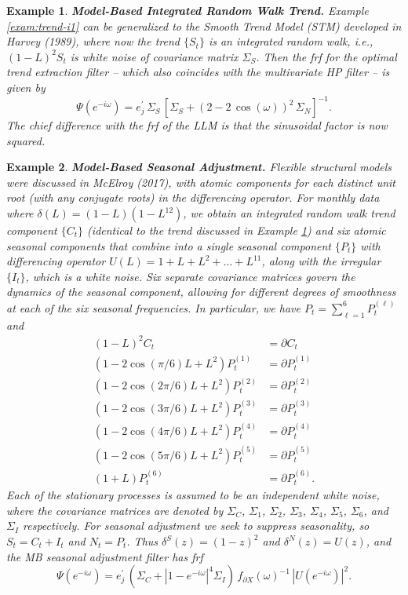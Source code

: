 \documentclass[a4paper]{book}
\newtheorem{Example}{Example}
\begin{document}
\begin{Example} {\bf Model-Based Integrated Random Walk Trend.} \rm
\label{exam:trend-i2}
  Example \ref{exam:trend-i1} can be generalized to the Smooth 
  Trend Model (STM) developed in Harvey (1989),
 where now the trend $\{ S_t \}$ is an integrated random walk, 
 i.e., ${(1-L)}^2 S_t$ is white noise of
 covariance matrix $\Sigma_{S}$.   Then the frf for the optimal 
 trend extraction filter -- which also coincides
 with the multivariate HP filter  -- is given by
\[ 
 \Psi (e^{-i \omega}) = e_j^{\prime} \, \Sigma_{S} \, 
 { \left[ \Sigma_{S} + {(2 - 2 \, \cos (\omega))}^2 \, \Sigma_{N} \right] }^{-1}.
\]
 The chief difference with the frf of the LLM is that the sinusoidal factor is now squared.  
\end{Example}




\begin{Example} {\bf Model-Based Seasonal Adjustment.} \rm
\label{exam:sa}
  Flexible structural models were discussed in McElroy (2017), 
  with atomic components for each distinct unit root
 (with any conjugate roots) in the differencing operator.  
 For monthly data  where $\delta (L) = (1-L)(1-L^{12})$,
 we obtain an integrated random walk trend component $\{ C_t \}$ 
 (identical to the trend discussed in Example \ref{exam:trend-i2})
 and six atomic seasonal components that combine into a single 
 seasonal component $\{ P_t \}$ with differencing
 operator $U(L) = 1 + L + L^2 + \ldots + L^{11}$, along with the
 irregular $\{ I_t \}$, which is a white noise. 
  Six separate covariance matrices govern the dynamics of the seasonal
  component, allowing for different degrees of
 smoothness at each of the six seasonal frequencies. 
 In particular, we have $P_t = \sum_{\ell=1}^6 P^{(\ell)}_t$ and
\begin{align*}
  {(1-L)}^2 C_t & = \partial C_t \\
   (1 - 2 \cos (\pi/6) L + L^2) P^{(1)}_t & = \partial P^{(1)}_t \\
  (1 - 2 \cos (2\pi/6) L + L^2) P^{(2)}_t & = \partial P^{(2)}_t \\
  (1 - 2 \cos (3\pi/6) L + L^2) P^{(3)}_t & = \partial P^{(3)}_t \\
  (1 - 2 \cos (4\pi/6) L + L^2) P^{(4)}_t & = \partial P^{(4)}_t \\
  (1 - 2 \cos (5\pi/6) L + L^2) P^{(5)}_t & = \partial P^{(5)}_t \\
  (1 +L) P^{(6)}_t & = \partial P^{(6)}_t. 
 \end{align*}
 Each of the stationary processes is assumed to be an independent white noise,
 where the covariance matrices are denoted by $\Sigma_C$, $\Sigma_{1}$,
  $\Sigma_2$, $\Sigma_3$, $\Sigma_4$, $\Sigma_5$, $\Sigma_6$, and 
  $\Sigma_I$ respectively.   For seasonal adjustment we seek to suppress
  seasonality, so $S_t = C_t + I_t$ and $N_t = P_t$.  Thus $\delta^S (z) = {(1-z)}^2$
  and $\delta^N (z) = U(z)$, and the MB seasonal adjustment filter   has frf
\[
  \Psi (e^{-i \omega}) = e_j^{\prime} \, \left( \Sigma_{C} + {|1 - e^{-i \omega}|}^4
   \Sigma_I \right) \, 
    { f_{\partial X} (\omega) }^{-1} \, {| U (e^{-i \omega}) |}^2.
\]
\end{Example}
\end{document}
